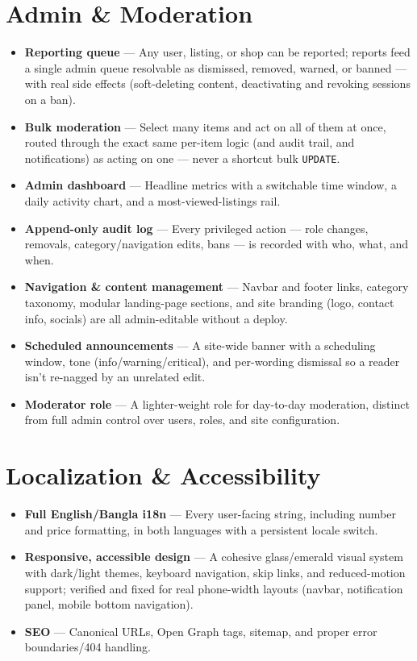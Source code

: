 \documentclass[11pt]{article}
\newcommand{\feature}[2]{%
  \item \textbf{#1} --- #2
}
\begin{document}
\section{Admin \& Moderation}
\begin{itemize}
  \feature{Reporting queue}{Any user, listing, or shop can be reported; reports feed a single admin queue resolvable as dismissed, removed, warned, or banned --- with real side effects (soft-deleting content, deactivating and revoking sessions on a ban).}
  \feature{Bulk moderation}{Select many items and act on all of them at once, routed through the exact same per-item logic (and audit trail, and notifications) as acting on one --- never a shortcut bulk \texttt{UPDATE}.}
  \feature{Admin dashboard}{Headline metrics with a switchable time window, a daily activity chart, and a most-viewed-listings rail.}
  \feature{Append-only audit log}{Every privileged action --- role changes, removals, category/navigation edits, bans --- is recorded with who, what, and when.}
  \feature{Navigation \& content management}{Navbar and footer links, category taxonomy, modular landing-page sections, and site branding (logo, contact info, socials) are all admin-editable without a deploy.}
  \feature{Scheduled announcements}{A site-wide banner with a scheduling window, tone (info/warning/critical), and per-wording dismissal so a reader isn't re-nagged by an unrelated edit.}
  \feature{Moderator role}{A lighter-weight role for day-to-day moderation, distinct from full admin control over users, roles, and site configuration.}
\end{itemize}

\section{Localization \& Accessibility}
\begin{itemize}
  \feature{Full English/Bangla i18n}{Every user-facing string, including number and price formatting, in both languages with a persistent locale switch.}
  \feature{Responsive, accessible design}{A cohesive glass/emerald visual system with dark/light themes, keyboard navigation, skip links, and reduced-motion support; verified and fixed for real phone-width layouts (navbar, notification panel, mobile bottom navigation).}
  \feature{SEO}{Canonical URLs, Open Graph tags, sitemap, and proper error boundaries/404 handling.}
\end{itemize}
\end{document}
